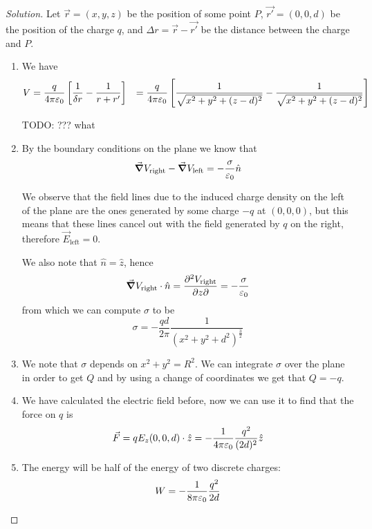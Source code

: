 \documentclass[12pt]{extarticle}
\begin{document}
\begin{proof}[Solution]
	Let $\vec r = (x, y, z)$ be the position of some point $P$, $\vec{r'} = (0,0,d)$ be the position of the charge $q$, and $\Delta r = \vec r -\vec{r'}$ be the distance between the charge and $P$.

	\begin{enumerate}[label = \alph*)]
		\item We have
		      \begin{align}
			      V & =  \frac{q}{4 \pi \varepsilon_0} \left[\frac{1}{\delta r} - \frac{1}{r+r'} \right]
			        & =\frac{q}{4 \pi \varepsilon_0} \left[\frac{1}{\sqrt{x^2 + y ^2 + (z-d)^2}} - \frac{1}{\sqrt{x^2 + y ^2 + (z-d)^2}} \right]
		      \end{align}

		      TODO: ??? what

		\item By the boundary conditions on the plane we know that
		      \begin{equation}
			      \grad V_\text{right} - \grad V_\text{left} = -\frac{\sigma}{\varepsilon_0} \hat n
		      \end{equation}

		      We observe that the field lines due to the induced charge density on the left of the plane are the ones generated by some charge $-q$ at $(0,0,0)$, but this means that these lines cancel out with the field generated by $q$ on the right, therefore $\vec E_\text{left}=0$.

		      We also note that $\hat n = \hat z$, hence
		      \begin{equation}
			      \grad V_\text{right} \cdot \hat n = \pdv{V_\text{right}}{z}{}(z=0) = -\frac{\sigma}{\varepsilon_0}
		      \end{equation}
		      from which we can compute $\sigma$ to be
		      \begin{equation}
			      \sigma = - \frac{qd}{2\pi} \frac{1}{(x^2 + y^2 + d^2)^{\frac{3}{2}}}
		      \end{equation}

		\item We note that $\sigma$ depends on $x^2 + y^2 = R^2$.
		      We can integrate $\sigma$ over the plane in order to get $Q$ and by using a change of coordinates we get that $Q=-q$.
		\item We have calculated the electric field before, now we can use it to find that the force on $q$ is
		      \begin{equation}
			      \vec F = q E_z (0,0,d) \cdot \hat z = - \frac{1}{4 \pi \varepsilon_0} \frac{q^2}{(2d)^2}\hat z
		      \end{equation}

		\item The energy will be half of the energy of two discrete charges:
		      \begin{equation}
			      W = - \frac{1}{8 \pi \varepsilon_0} \frac{q^2}{2d}
		      \end{equation}
	\end{enumerate}
\end{proof}
\end{document}
